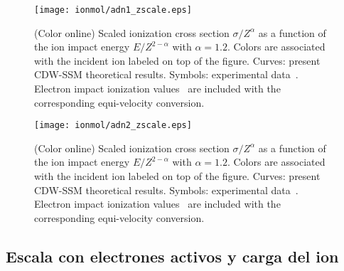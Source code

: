 \begin{figure}
\centering
\texttt{[image: ionmol/adn1\_zscale.eps]}
\caption{(Color online) Scaled ionization cross section $\sigma/Z^{\alpha}$ 
as a function of the ion impact energy $E/Z^{2-\alpha}$ with $\alpha=1.2$. 
Colors are associated with the incident ion labeled on top of the figure. 
Curves: present CDW-SSM theoretical results. 
Symbols: experimental data~\cite{itoh2013,iriki2011,wolff2014,wang2016,
tribedi2019,agnihotri2012,agnihotri2013,Luna2007,Rudd86,pRudd85,
toburen80,Ohsawa05,Bhattacharjee17,Luna_Li_water,DalCappello2009,
Tribedi_O_water}. Electron impact ionization values~\cite{rahman2016,
bug2017,wolf2019,fuss2009} are included with the corresponding 
equi-velocity conversion.}
\label{fig:zreduced}
\end{figure} 

\begin{figure}
\centering
\texttt{[image: ionmol/adn2\_zscale.eps]}
\caption{(Color online) Scaled ionization cross section $\sigma/Z^{\alpha}$ 
as a function of the ion impact energy $E/Z^{2-\alpha}$ with $\alpha=1.2$. 
Colors are associated with the incident ion labeled on top of the figure. 
Curves: present CDW-SSM theoretical results. 
Symbols: experimental data~\cite{itoh2013,iriki2011,wolff2014,wang2016,
tribedi2019,agnihotri2012,agnihotri2013,Luna2007,Rudd86,pRudd85,
toburen80,Ohsawa05,Bhattacharjee17,Luna_Li_water,DalCappello2009,
Tribedi_O_water}. Electron impact ionization values~\cite{rahman2016,
bug2017,wolf2019,fuss2009} are included with the corresponding 
equi-velocity conversion.}
\label{fig:zreduced}
\end{figure} 

\subsection{Escala con electrones activos y carga del ion}
\label{sec:nez_scaling}

